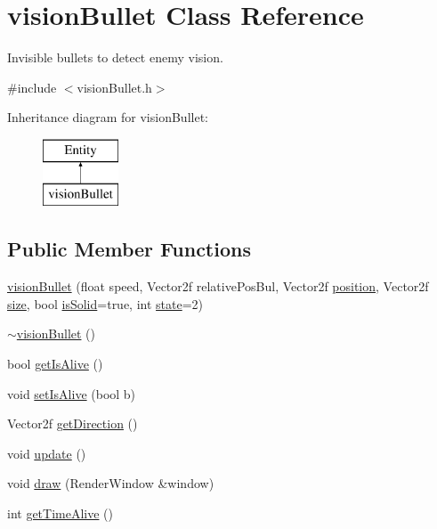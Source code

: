 \hypertarget{classvision_bullet}{}\section{vision\+Bullet Class Reference}
\label{classvision_bullet}


Invisible bullets to detect enemy vision.  




{\ttfamily \#include $<$vision\+Bullet.\+h$>$}

Inheritance diagram for vision\+Bullet\+:\begin{figure}[H]
\begin{center}
\leavevmode
\includegraphics[height=2.000000cm]{classvision_bullet}
\end{center}
\end{figure}
\subsection*{Public Member Functions}
\begin{DoxyCompactItemize}
\item 
\hyperlink{classvision_bullet_af168dc7280da3a5663fc7d91518ff005}{vision\+Bullet} (float speed, Vector2f relative\+Pos\+Bul, Vector2f \hyperlink{class_entity_a6af9d6498134ad0906011778bc5736db}{position}, Vector2f \hyperlink{class_entity_ae9a0a364c85f91ade5088b3610131417}{size}, bool \hyperlink{class_entity_af1b0754c9d5f4afa73834b23c6437101}{is\+Solid}=true, int \hyperlink{class_entity_a4edd9cc2506add0d9e27fade0bf957e8}{state}=2)
\item 
\hyperlink{classvision_bullet_aa96d05163bb81ae5c86f173cbd36de3b}{$\sim$vision\+Bullet} ()
\item 
bool \hyperlink{classvision_bullet_a01a4cf06a2403aa6dce98ecd52b23bf0}{get\+Is\+Alive} ()
\item 
void \hyperlink{classvision_bullet_a67881b6eb8c31e128ff1ecc5ed110855}{set\+Is\+Alive} (bool b)
\item 
Vector2f \hyperlink{classvision_bullet_a381783842104058048b9abffb693d55e}{get\+Direction} ()
\item 
void \hyperlink{classvision_bullet_a425ac17ace4a29879a9a204ffc29021d}{update} ()
\item 
void \hyperlink{classvision_bullet_ab2f4d4a63991b39480e3064ed5ee3809}{draw} (Render\+Window \&window)
\item 
int \hyperlink{classvision_bullet_a152e9b57ee511a97c9050dbf8ed84b90}{get\+Time\+Alive} ()
\end{DoxyCompactItemize}
